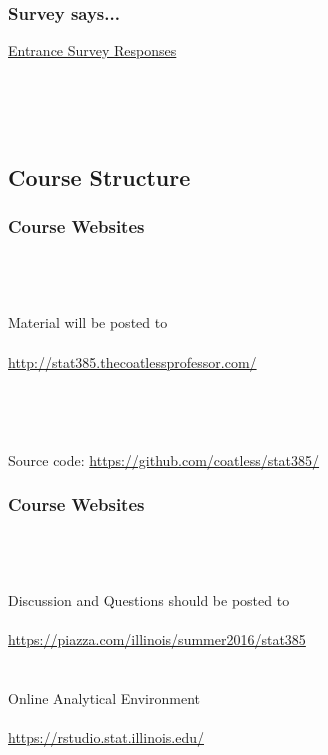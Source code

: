 \documentclass{beamer}\usepackage[]{graphicx}\usepackage[]{color}
\begin{document}
\begin{frame}[fragile]
\frametitle{Survey says...}

\centering
\Huge
\href{https://docs.google.com/forms/d/1SfdWzg1Ak2ZttHhWRJf1e8vKMbaFzBDT_HVUHyuIO3k/viewanalytics#responses}{Entrance Survey Responses}

\end{frame}

\begin{frame}
\begin{center}
{\fontsize{2.5cm}{2cm}\selectfont{Now you!}}
\\
{\fontsize{1cm}{2cm}\selectfont{What's your name?}}\\$ $\\
{\fontsize{1cm}{2cm}\selectfont{Why are you here?}}
\end{center}
\end{frame}


\subsection{Course Structure}

\begin{frame}
\frametitle{Course Websites}

$ $\\$ $\\$ $\\
\centering
{\Large
Material will be posted to \\$ $\\
\url{http://stat385.thecoatlessprofessor.com/}}
\\$ $\\$ $\\$ $\\$ $\\
\hfill Source code: \url{https://github.com/coatless/stat385/}
\end{frame}

\begin{frame}
\frametitle{Course Websites}

$ $\\$ $\\$ $\\
\centering
{\Large
Discussion and Questions should be posted to \\$ $\\
\url{https://piazza.com/illinois/summer2016/stat385}}
$ $\\$ $\\$ $\\
\centering
{\Large
Online Analytical Environment \\$ $\\
\url{https://rstudio.stat.illinois.edu/}}
\end{frame}
\end{document}
